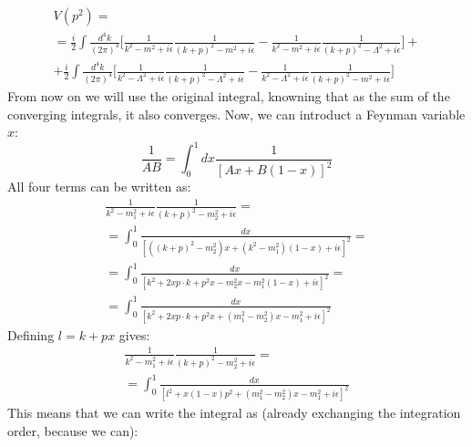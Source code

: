 \documentclass{article}
\begin{document}
\begin{equation}
\begin{gathered}
    V\left(p^2\right) = \\ =
    \frac{i}{2}\int \frac{d^4k}{(2\pi)^4}\Bigg[
        \frac{1}{k^2 - m^2 + i\epsilon}\frac{1}{(k + p)^2 - m^2 + i\epsilon} -
        \frac{1}{k^2 - m^2 + i\epsilon}\frac{1}{(k + p)^2 - \Lambda^2 + i\epsilon}
    \Bigg] + \\ +
    \frac{i}{2}\int \frac{d^4k}{(2\pi)^4}\Bigg[
        \frac{1}{k^2 - \Lambda^2 + i\epsilon}\frac{1}{(k + p)^2 - \Lambda^2 + i\epsilon} -
        \frac{1}{k^2 - \Lambda^2 + i\epsilon}\frac{1}{(k + p)^2 - m^2 + i\epsilon}
    \Bigg]
\end{gathered}
\end{equation}
From now on we will use the original integral, knowning that as the sum of the converging integrals, it also converges. Now, we can introduct a Feynman variable $x$:
\begin{equation}
    \frac{1}{AB} = \int_0^1 dx \frac{1}{\left[Ax + B(1 - x)\right]^2}
\end{equation}
All four terms can be written as:
\begin{equation}
\begin{gathered}
    \frac{1}{k^2 - m_1^2 + i\epsilon}\frac{1}{(k + p)^2 - m_2^2 + i\epsilon} = \\ = \int_0^1 \frac{dx}{\left[
        \left((k + p)^2 - m_2^2\right)x +
        \left(k^2 - m_1^2\right)(1 - x)
        + i\epsilon
    \right]^2} = \\ =
    \int_0^1 \frac{dx}{\left[
        k^2 + 2xp\cdot k + p^2 x - m_2^2 x - m_1^2(1 - x)
        + i\epsilon
    \right]^2} = \\ =
    \int_0^1 \frac{dx}{\left[
        k^2 + 2xp\cdot k + p^2 x + \left(m_1^2 - m_2^2\right) x - m_1^2
        + i\epsilon
    \right]^2}
\end{gathered}
\end{equation}
Defining $l = k + px$ gives:
\begin{equation}
\begin{gathered}
    \frac{1}{k^2 - m_1^2 + i\epsilon}\frac{1}{(k + p)^2 - m_2^2 + i\epsilon} = \\ =
    \int_0^1 \frac{dx}{\left[
        l^2 + x(1 - x) p^2  + \left(m_1^2 - m_2^2\right) x - m_1^2
        + i\epsilon
    \right]^2}
\end{gathered}
\end{equation}
This means that we can write the integral as (already exchanging the integration order, because we can):
\end{document}
